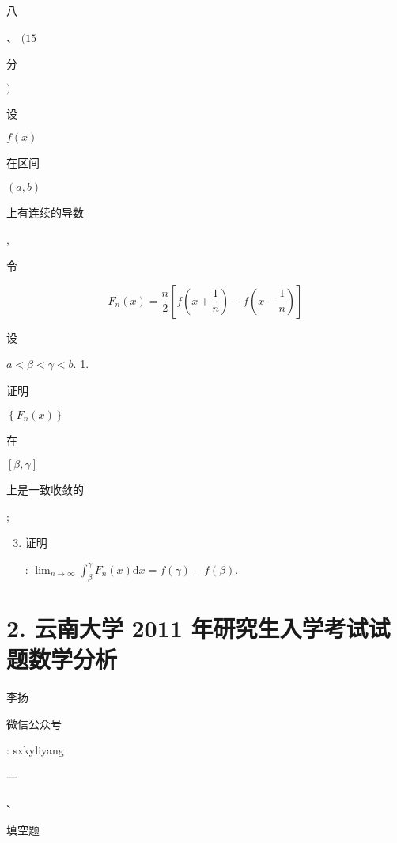 \documentclass[10pt]{article}
\begin{document}
\begin{CJK}{UTF8}{mj}八\end{CJK}、 $(15$ \begin{CJK}{UTF8}{mj}分\end{CJK} $)$ \begin{CJK}{UTF8}{mj}设\end{CJK} $f(x)$ \begin{CJK}{UTF8}{mj}在区间\end{CJK} $(a, b)$ \begin{CJK}{UTF8}{mj}上有连续的导数\end{CJK}, \begin{CJK}{UTF8}{mj}令\end{CJK}
$$
F_{n}(x)=\frac{n}{2}\left[f\left(x+\frac{1}{n}\right)-f\left(x-\frac{1}{n}\right)\right]
$$
\begin{CJK}{UTF8}{mj}设\end{CJK} $a<\beta<\gamma<b$. 1. \begin{CJK}{UTF8}{mj}证明\end{CJK} $\left\{F_{n}(x)\right\}$ \begin{CJK}{UTF8}{mj}在\end{CJK} $[\beta, \gamma]$ \begin{CJK}{UTF8}{mj}上是一致收敛的\end{CJK};

\begin{enumerate}
  \setcounter{enumi}{2}
  \item \begin{CJK}{UTF8}{mj}证明\end{CJK}: $\lim _{n \rightarrow \infty} \int_{\beta}^{\gamma} F_{n}(x) \mathrm{d} x=f(\gamma)-f(\beta)$.
\end{enumerate}
\section{2. 云南大学 2011 年研究生入学考试试题数学分析}
\begin{CJK}{UTF8}{mj}李扬\end{CJK}

\begin{CJK}{UTF8}{mj}微信公众号\end{CJK}: sxkyliyang

\begin{CJK}{UTF8}{mj}一\end{CJK}、\begin{CJK}{UTF8}{mj}填空题\end{CJK}
\end{document}
